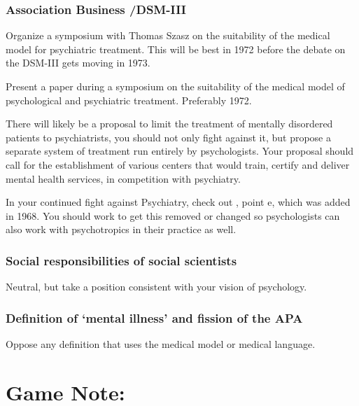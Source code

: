 \begin{refsection}
\subsubsection{Association Business \slash  DSM-III}
\label{associationbusinessdsm-iii}

Organize a symposium with Thomas Szasz on the suitability of the medical model for psychiatric treatment. This will be best in 1972 before the debate on the DSM-III gets moving in 1973.\begin{writingtask}[Albee]\label{writingtask:albee}
Present a paper during a symposium on the suitability of the medical model of psychological and psychiatric treatment. Preferably 1972.
\end{writingtask}

There will likely be a proposal to limit the treatment of mentally disordered patients to psychiatrists, you should not only fight against it, but propose a separate system of treatment run entirely by psychologists. Your proposal should call for the establishment of various centers that would train, certify and deliver mental health services, in competition with psychiatry. 

In your continued fight against Psychiatry, check out , point e, which was added in 1968. You should work to get this removed or changed so psychologists can also work with psychotropics in their practice as well.

\subsubsection{Social responsibilities of social scientists}
\label{socialresponsibilitiesofsocialscientists}

Neutral, but take a position consistent with your vision of psychology.

\subsubsection{Definition of ‘mental illness’ and fission of the APA}
\label{definitionof‘mentalillness’andfissionoftheapa}

Oppose any definition that uses the medical model or medical language.

\section{Game Note:}
\label{gamenote:}


\end{refsection}
